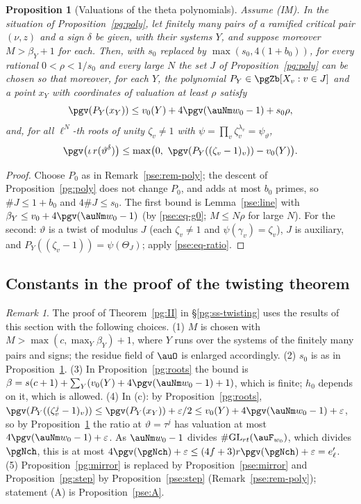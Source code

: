\documentclass[10pt]{amsart}
\newtheorem{proposition}[theorem]{Proposition}
\theoremstyle{definition}
\theoremstyle{remark}
\newtheorem{remark}[theorem]{Remark}
\begin{document}
\begin{proposition}[Valuations of the theta polynomials]\label{pse:stick}
Assume (IM). In the situation of Proposition~\ref{pg:poly}, let finitely many pairs of a ramified
critical pair $(\nu,z)$ and a sign $\delta$ be given, with their systems $Y$, and suppose moreover
$M>\beta_Y+1$ for each. Then, with $s_0$ replaced by $\max(s_0,4(1+b_0))$, for every rational
$0<\rho<1/s_0$ and every large $N$ the set $J$ of Proposition~\ref{pg:poly} can be chosen so that
moreover, for each $Y$, the polynomial $P_Y\in\pgZb[X_v:v\in J]$ and a point $x_Y$ with
coordinates of valuation at least $\rho$ satisfy
\[
\pgv(P_Y(x_Y))\le v_0(Y)+4\pgv(\auNm w_0-1)+s_0\rho ,
\]
and, for all $\ell^N$-th roots of unity $\zeta_v\ne1$ with $\psi=\prod_v\zeta_v^{\lambda_v}=
\psi_\vartheta$,
\[
\pgv\bigl(\iota\,r(\vartheta^{\delta})\bigr)\le\max\bigl(0,\ \pgv(P_Y((\zeta_v-1)_v))-v_0(Y)\bigr).
\]
\end{proposition}
\begin{proof}
Choose $P_0$ as in Remark~\ref{pse:rem-poly}; the descent of Proposition~\ref{pg:poly} does not
change $P_0$, and adds at most $b_0$ primes, so $\#J\le1+b_0$ and $4\#J\le s_0$. The first bound is
Lemma~\ref{pse:line} with $\beta_Y\le v_0+4\pgv(\auNm w_0-1)$ (by \eqref{pse:eq-g0}; $M\le N\rho$
for large $N$). For the second: $\vartheta$ is a twist of modulus $J$ (each $\zeta_v\ne1$ and
$\psi(\gamma_v)=\zeta_v$), $J$ is auxiliary, and $P_Y((\zeta_v-1))=\psi(\Theta_J)$; apply
\eqref{pse:eq-ratio}.
\end{proof}

\subsection{Constants in the proof of the twisting theorem}\label{pse:ss-end}

\begin{remark}\label{pse:rem-constants}
The proof of Theorem~\ref{pg:II} in \S\ref{pg:ss-twisting} uses the results of this section with the following choices. (1) $M$ is chosen with
$M>\max(c,\max_Y\beta_Y)+1$, where $Y$ runs over the systems of the finitely many pairs and signs;
the residue field of $\auO$ is enlarged accordingly. (2) $s_0$ is as in Proposition~\ref{pse:stick}.
(3) In Proposition~\ref{pg:roots} the bound is $\beta=s(c+1)+\sum_Y(v_0(Y)+4\pgv(\auNm w_0-1)+1)$,
which is finite; $h_0$ depends on it, which is allowed. (4) In (c): by Proposition~\ref{pg:roots},
$\pgv(P_Y((\zeta_v^j-1)_v))\le\pgv(P_Y(x_Y))+\varepsilon/2\le v_0(Y)+4\pgv(\auNm w_0-1)+\varepsilon$,
so by Proposition~\ref{pse:stick} the ratio at $\vartheta=\tau^j$ has valuation at most
$4\pgv(\auNm w_0-1)+\varepsilon$. As $\auNm w_0-1$ divides $\#\mathrm{GL}_{rt}(\auF_{w_0})$, which
divides $\pgNch$, this is at most $4\pgv(\pgNch)+\varepsilon\le(4f+3)r\pgv(\pgNch)+\varepsilon=
e'_\ell$. (5) Proposition~\ref{pg:mirror} is replaced by Proposition~\ref{pse:mirror} and
Proposition~\ref{pg:step} by Proposition~\ref{pse:step} (Remark~\ref{pse:rem-poly}); statement (A)
is Proposition~\ref{pse:A}.
\end{remark}
\end{document}
